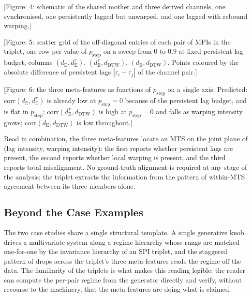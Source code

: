 \documentclass{article}
\theoremstyle{plain}
\theoremstyle{definition}
\theoremstyle{remark}
\newcommand{\figph}[1]{{\color{red}[Figure: #1]}}
\begin{document}
\figph{4: schematic of the shared mother and three derived channels, one synchronised, one persistently lagged but unwarped, and one lagged with rebound warping.}

\figph{5: scatter grid of the off-diagonal entries of each pair of MPIs in the triplet, one row per value of $p_{\mathrm{step}}$ on a sweep from $0$ to $0.9$ at fixed persistent-lag budget, columns $(d_{\mathrm{E}},d_{\mathrm{E}}^{\tau})$, $(d_{\mathrm{E}}^{\tau},d_{\mathrm{DTW}})$, $(d_{\mathrm{E}},d_{\mathrm{DTW}})$. Points coloured by the absolute difference of persistent lags $|\tau_i - \tau_j|$ of the channel pair.}

\figph{6: the three meta-features as functions of $p_{\mathrm{step}}$ on a single axis. Predicted: $\mathrm{corr}(d_{\mathrm{E}}, d_{\mathrm{E}}^{\tau})$ is already low at $p_{\mathrm{step}}=0$ because of the persistent lag budget, and is flat in $p_{\mathrm{step}}$; $\mathrm{corr}(d_{\mathrm{E}}^{\tau}, d_{\mathrm{DTW}})$ is high at $p_{\mathrm{step}}=0$ and falls as warping intensity grows; $\mathrm{corr}(d_{\mathrm{E}}, d_{\mathrm{DTW}})$ is low throughout.}

Read in combination, the three meta-features locate an MTS on the joint plane of (lag intensity, warping intensity): the first reports whether persistent lags are present, the second reports whether local warping is present, and the third reports total misalignment. No ground-truth alignment is required at any stage of the analysis; the triplet extracts the information from the pattern of within-MTS agreement between its three members alone.

\subsection{Beyond the Case Examples}
\label{sec:beyond}

The two case studies share a single structural template. A single generative knob drives a multivariate system along a regime hierarchy whose rungs are matched one-for-one by the invariance hierarchy of an SPI triplet, and the staggered pattern of drops across the triplet's three meta-features reads the regime off the data. The familiarity of the triplets is what makes this reading legible: the reader can compute the per-pair regime from the generator directly and verify, without recourse to the machinery, that the meta-features are doing what is claimed.
\end{document}

